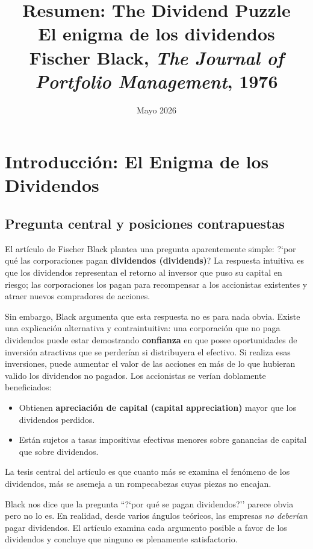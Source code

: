 \documentclass[12pt]{article}
\title{\textbf{Resumen: The Dividend Puzzle}\\
\large El enigma de los dividendos\\
\normalsize Fischer Black, \textit{The Journal of Portfolio Management}, 1976}
\author{}
\date{Mayo 2026}
\begin{document}
\maketitle
\tableofcontents
\newpage

\section{Introducci\'on: El Enigma de los Dividendos}

\subsection{Pregunta central y posiciones contrapuestas}

El art\'iculo de Fischer Black plantea una pregunta aparentemente simple: ?`por qu\'e las corporaciones pagan \textbf{dividendos (dividends)}? La respuesta intuitiva es que los dividendos representan el retorno al inversor que puso su capital en riesgo; las corporaciones los pagan para recompensar a los accionistas existentes y atraer nuevos compradores de acciones.

Sin embargo, Black argumenta que esta respuesta no es para nada obvia. Existe una explicaci\'on alternativa y contraintuitiva: una corporaci\'on que no paga dividendos puede estar demostrando \textbf{confianza} en que posee oportunidades de inversi\'on atractivas que se perder\'ian si distribuyera el efectivo. Si realiza esas inversiones, puede aumentar el valor de las acciones en m\'as de lo que hubieran valido los dividendos no pagados. Los accionistas se ver\'ian doblamente beneficiados:
\begin{itemize}
  \item Obtienen \textbf{apreciaci\'on de capital (capital appreciation)} mayor que los dividendos perdidos.
  \item Est\'an sujetos a tasas impositivas efectivas menores sobre ganancias de capital que sobre dividendos.
\end{itemize}

La tesis central del art\'iculo es que cuanto m\'as se examina el fen\'omeno de los dividendos, m\'as se asemeja a un rompecabezas cuyas piezas no encajan.

\begin{intuicion}
Black nos dice que la pregunta ``?`por qu\'e se pagan dividendos?'' parece obvia pero no lo es. En realidad, desde varios \'angulos te\'oricos, las empresas \textit{no deber\'ian} pagar dividendos. El art\'iculo examina cada argumento posible a favor de los dividendos y concluye que ninguno es plenamente satisfactorio.
\end{intuicion}
\end{document}
